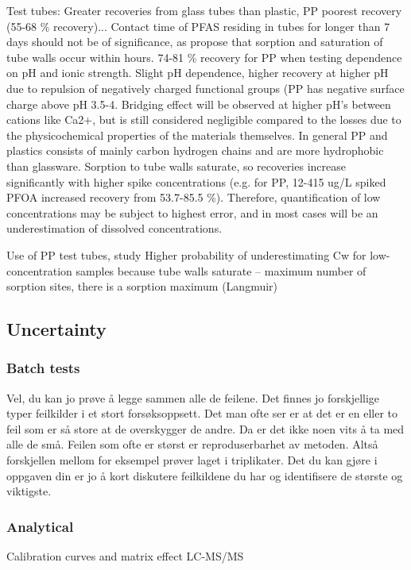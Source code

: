 Test tubes: Greater recoveries from glass tubes than plastic, PP poorest recovery (55-68 \% recovery)... Contact time of PFAS residing in tubes for longer than 7 days should not be of significance, as \citep{Lath2019labsorb} propose that sorption and saturation of tube walls occur within hours. 74-81 \% recovery for PP when testing dependence on pH and ionic strength. Slight pH dependence, higher recovery at higher pH due to repulsion of negatively charged functional groups (PP has negative surface charge above pH 3.5-4. Bridging effect will be observed at higher pH's between cations like Ca2+, but is still considered negligible compared to the losses due to the physicochemical properties of the materials themselves. In general PP and plastics consists of mainly carbon hydrogen chains and are more hydrophobic than glassware. Sorption to tube walls saturate, so recoveries increase significantly with higher spike concentrations (e.g. for PP, 12-415 ug/L spiked PFOA increased recovery from 53.7-85.5 \%). Therefore, quantification of low concentrations may be subject to highest error, and in most cases will be an underestimation of dissolved concentrations. 

Use of PP test tubes, study
Higher probability of underestimating Cw for low-concentration samples because tube walls saturate – maximum number of sorption sites, there is a sorption maximum (Langmuir)

\subsection{Uncertainty}
\subsubsection{Batch tests}
Vel, du kan jo prøve å legge sammen alle de feilene. Det finnes jo forskjellige typer feilkilder i et stort forsøksoppsett. Det man ofte ser er at det er en eller to feil som er så store at de overskygger de andre. Da er det ikke noen vits å ta med alle de små. Feilen som ofte er størst er reproduserbarhet av metoden. Altså forskjellen mellom for eksempel prøver laget i triplikater. Det du kan gjøre i oppgaven din er jo å kort diskutere feilkildene du har og identifisere de største og viktigste.

\subsubsection{Analytical}
Calibration curves and matrix effect
LC-MS/MS

